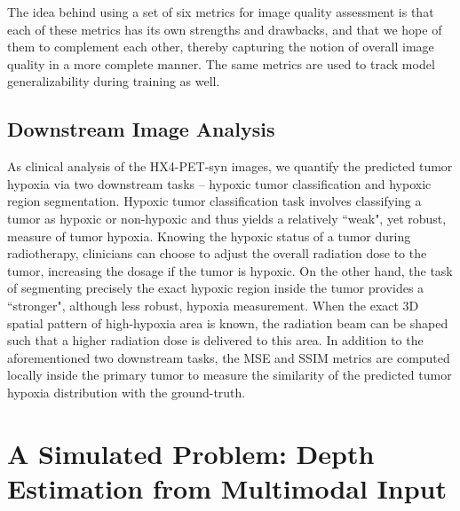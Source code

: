 The idea behind using a set of six metrics for image quality assessment is that each of these metrics has its own strengths and drawbacks, and that we hope of them to complement each other, thereby capturing the notion of overall image quality in a more complete manner. The same metrics are used to track model generalizability during training as well. 


\subsection{Downstream Image Analysis}
As clinical analysis of the HX4-PET-syn images, we quantify the predicted tumor hypoxia via two downstream tasks -- hypoxic tumor classification and hypoxic region segmentation. Hypoxic tumor classification task involves classifying a tumor as hypoxic or non-hypoxic and thus yields a relatively ``weak", yet robust, measure of tumor hypoxia. Knowing the hypoxic status of a tumor during radiotherapy, clinicians can choose to adjust the overall radiation dose to the tumor, increasing the dosage if the tumor is hypoxic. On the other hand, the task of segmenting precisely the exact hypoxic region inside the tumor provides a ``stronger", although less robust, hypoxia measurement. When the exact 3D spatial pattern of high-hypoxia area is known, the radiation beam can be shaped such that a higher radiation dose is delivered to this area. In addition to the aforementioned two downstream tasks, the MSE and SSIM metrics are computed locally inside the primary tumor to measure the similarity of the predicted tumor hypoxia distribution with the ground-truth. 



\section{A Simulated Problem: Depth Estimation from Multimodal Input}
\label{ClearGrasp_Depth_Estimation}

